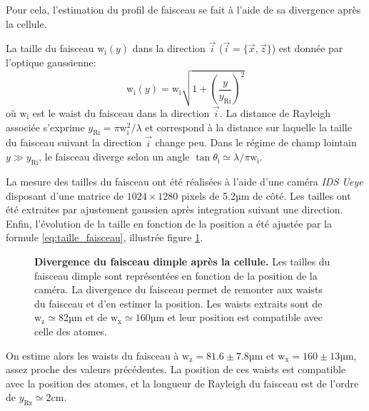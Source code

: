 Pour cela, l'estimation du profil de faisceau se fait à l'aide de sa divergence après la cellule. 




La taille du faisceau $\mathrm{w}_{\mathrm{i}}(y)$ dans la direction $\vec{i}$ ($\vec{i}= \lbrace \vec{x},\vec{z} \rbrace$) est donnée par l'optique gaussienne:
\begin{equation}
\mathrm{w}_{\mathrm{i}}(y)=\mathrm{w}_{\mathrm{i}} \sqrt{1+\left( \frac{y}{y_{\mathrm{Ri}}} \right)^2}
\label{eq:taille_faisceau}
\end{equation}
où $\mathrm{w}_{\mathrm{i}}$ est le waist du faisceau dans la direction $\vec{i}$. La distance de Rayleigh associée s'exprime $y_{\mathrm{Ri}}=\pi \mathrm{w}_{\mathrm{i}}^2 / \lambda$ et correspond à la distance sur laquelle la taille du faisceau suivant la direction $\vec{i}$ change peu. Dans le régime de champ lointain $y \gg y_{\mathrm{Ri}}$, le faisceau diverge selon un angle $\tan \theta_{\mathrm{i}} \simeq \lambda / \pi \mathrm{w}_{\mathrm{i}}$.

La mesure des tailles du faisceau ont été réalisées à l'aide d'une caméra \emph{IDS Ueye} disposant d'une matrice de $1024 \times 1280$ pixels de 5.2µm de côté. Les tailles ont été extraites par ajustement gaussien après integration suivant une direction. Enfin, l'évolution de la taille en fonction de la position a été ajustée par la formule \ref{eq:taille_faisceau}, illustrée figure \ref{fig:taille_dimple}.

\begin{figure}
\centering

\caption{\textbf{Divergence du faisceau dimple après la cellule.} Les tailles du faisceau dimple sont représentées en fonction de la position de la caméra. La divergence du faisceau permet de remonter aux waists du faisceau et d'en estimer la position. Les waists extraits sont de $\mathrm{w_z}\simeq$82µm et de $\mathrm{w_x}\simeq160$µm et leur position est compatible avec celle des atomes.}
\label{fig:taille_dimple}
\end{figure}

On estime alors les waists du faisceau à $\mathrm{w_z}=81.6 \pm 7.8$µm et $\mathrm{w_x}=160\pm 13$µm, assez proche des valeurs précédentes. La position de ces waists est compatible avec la position des atomes, et la longueur de Rayleigh du faisceau est de l'ordre de $y_{\mathrm{Rz}}\simeq$2cm. 









